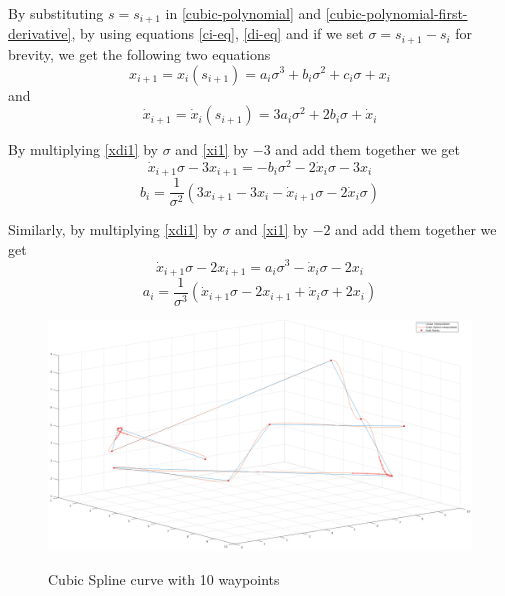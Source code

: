 By substituting $s = s_{i+1}$ in \ref{cubic-polynomial} and \ref{cubic-polynomial-first-derivative}, by using equations \ref{ci-eq}, \ref{di-eq} and if 
we set $σ = s_{i+1}-s_i$ for brevity, we get the following two equations
\begin{equation}
\label{xi1}
x_{i+1} = x_i(s_{i+1}) = a_i σ^3 + b_i σ^2 + c_i σ + x_i
\end{equation}
and
\begin{equation}
\label{xdi1}
\dot{x}_{i+1} = \dot{x}_i(s_{i+1}) = 3a_i σ^2 + 2b_i σ + \dot{x}_i
\end{equation}

By multiplying \ref{xdi1} by $σ$ and \ref{xi1} by $-3$ and add them together we get
\[
\dot{x}_{i+1}σ - 3x_{i+1} = -b_iσ^2 -2\dot{x}_iσ - 3x_i
\]
\begin{equation}
b_i = \frac{1}{σ^2} (3x_{i+1} -3x_i - \dot{x}_{i+1}σ - 2\dot{x}_iσ)
\end{equation}

Similarly, by multiplying \ref{xdi1} by $σ$ and \ref{xi1} by $-2$ and add them together we get
\[
\dot{x}_{i+1}σ - 2x_{i+1} = a_iσ^3 -\dot{x}_iσ - 2x_i
\]
\begin{equation}
a_i = \frac{1}{σ^3} (\dot{x}_{i+1}σ - 2x_{i+1} + \dot{x}_iσ +2x_i)
\end{equation}

\begin{center}
\begin{figure}[htbp]
\centering
\includegraphics[width=\textwidth]{images/cubic-spline-path1.png}\\
\caption{Cubic Spline curve with 10 waypoints} 
\label{cubic-spline-explanation}
\end{figure}
\end{center}

